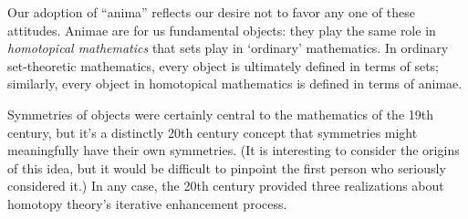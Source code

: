 Our adoption of \enquote{anima} reflects our desire not to favor any one of these attitudes.
Animae are for us fundamental objects:
they play the same role in \emph{homotopical mathematics} that sets play in `ordinary' mathematics.
In ordinary set-theoretic mathematics, every object is ultimately defined in terms of sets;
similarly, every object in homotopical mathematics is defined in terms of animae.

Symmetries of objects were certainly central to the mathematics of the 19th century, but
it's a distinctly 20th century concept that symmetries might meaningfully have their own symmetries.
(It is interesting to consider the origins of this idea, but
it would be difficult to pinpoint the first person who seriously considered it.)
In any case, the 20th century provided three realizations about homotopy theory's iterative enhancement process.

